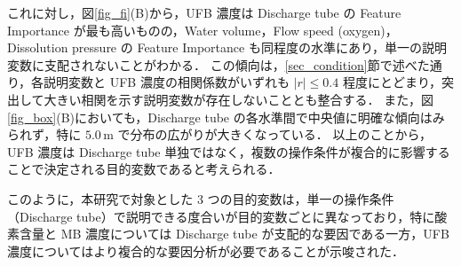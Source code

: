 これに対し，図\ref{fig_fi}(B)から，UFB 濃度は Discharge tube の Feature Importance が最も高いものの，Water volume，Flow speed (oxygen)，Dissolution pressure の Feature Importance も同程度の水準にあり，単一の説明変数に支配されないことがわかる．
この傾向は，\ref{sec_condition}節で述べた通り，各説明変数と UFB 濃度の相関係数がいずれも $ |r| \leq 0.4 $ 程度にとどまり，突出して大きい相関を示す説明変数が存在しないこととも整合する．
また，図\ref{fig_box}(B)においても，Discharge tube の各水準間で中央値に明確な傾向はみられず，特に $ 5.0\,\mathrm{m} $ で分布の広がりが大きくなっている．
以上のことから，UFB 濃度は Discharge tube 単独ではなく，複数の操作条件が複合的に影響することで決定される目的変数であると考えられる．

このように，本研究で対象とした 3 つの目的変数は，単一の操作条件（Discharge tube）で説明できる度合いが目的変数ごとに異なっており，特に酸素含量と MB 濃度については Discharge tube が支配的な要因である一方，UFB 濃度についてはより複合的な要因分析が必要であることが示唆された．
